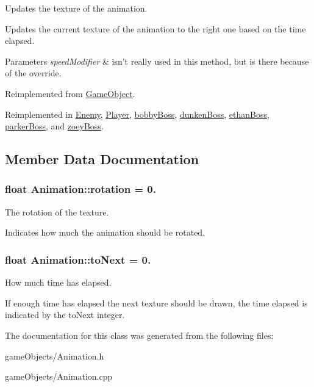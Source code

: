 Updates the texture of the animation. 

Updates the current texture of the animation to the right one based on the time elapsed. 
\begin{DoxyParams}{Parameters}
{\em speed\+Modifier} & isn't really used in this method, but is there because of the override. \\
\hline
\end{DoxyParams}


Reimplemented from \hyperlink{class_game_object_acf6423054877d1344b6e0b1f4e740df5}{Game\+Object}.



Reimplemented in \hyperlink{class_enemy_a5509b06f70a649c4ea9d1fb06f07cb5c}{Enemy}, \hyperlink{class_player_a70e7b6ef62c5b8080e454edcb15cacc8}{Player}, \hyperlink{classbobby_boss_a1ba19c55017f2fb3f0b1679d82095d78}{bobby\+Boss}, \hyperlink{classdunken_boss_ad9ae91ab3ce0b97ee48ab90203c7e4fd}{dunken\+Boss}, \hyperlink{classethan_boss_a6e47b12c5e718ecee5d888bcde580c1a}{ethan\+Boss}, \hyperlink{classparker_boss_a5f82194f8880924981fccd4bf611f324}{parker\+Boss}, and \hyperlink{classzoey_boss_aa712b8f9050e3851cb0133927acd3f54}{zoey\+Boss}.



\subsection{Member Data Documentation}
\hypertarget{class_animation_a5c68dd5bc1004cf064ff0c2d3aad9abb}{
\subsubsection[{rotation}]{\setlength{\rightskip}{0pt plus 5cm}float Animation\+::rotation = 0.\hspace{0.3cm}{\ttfamily [protected]}}}\label{class_animation_a5c68dd5bc1004cf064ff0c2d3aad9abb}


The rotation of the texture. 

Indicates how much the animation should be rotated. \hypertarget{class_animation_afd9ad77afa13d0dc50586e0780ab6b20}{
\subsubsection[{to\+Next}]{\setlength{\rightskip}{0pt plus 5cm}float Animation\+::to\+Next = 0.\hspace{0.3cm}{\ttfamily [protected]}}}\label{class_animation_afd9ad77afa13d0dc50586e0780ab6b20}


How much time has elapsed. 

If enough time has elapsed the next texture should be drawn, the time elapsed is indicated by the to\+Next integer. 

The documentation for this class was generated from the following files\+:\begin{DoxyCompactItemize}
\item 
game\+Objects/Animation.\+h\item 
game\+Objects/Animation.\+cpp\end{DoxyCompactItemize}
